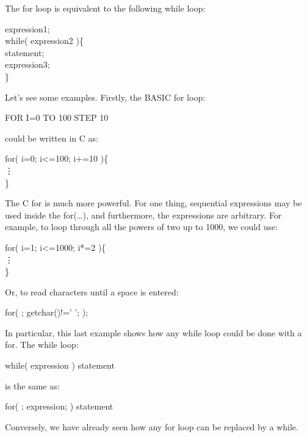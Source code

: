 The {\cd for} loop is equivalent to the following {\cd while} loop:
\begin{code}
{\ms expression1\/}; \\
while( {\ms expression2\/} )\{ \\
\>  {\ms statement\/}; \\
\>  {\ms expression3\/}; \\
\} 
\end{code}
\noindent
     Let's see some examples. Firstly, the BASIC for loop:
\begin{code}
FOR I=0 TO 100 STEP 10
\end{code}
\noindent
     could be written in C as:
\begin{code}
for( i=0; i<=100; i+=10 )\{ \\
\> \vdots \\
\}
\end{code}
\noindent
     The C  {\cd for} is  much more  powerful. For one thing,
sequential expressions may be  used inside the {\cd for(\ldots)}, and 
furthermore, the expressions are arbitrary. For example, to loop
through all the powers of two up to 1000, we could use:
 \begin{code}
for( i=1; i<=1000; i*=2 )\{ \\
\> \vdots \\
\}
\end{code}
\noindent
     Or, to read characters until a space is entered:
\begin{code}
for( ; getchar()!=' '; );
\end{code}
\noindent
     In particular,  this last  example shows how any {\cd while}
loop could be done with a {\cd for}. The {\cd while} 
loop:
\begin{code}
while( {\ms expression\/} ) {\ms statement\/}
\end{code}
\noindent
     is the same as:
\begin{code}
for( ; {\ms expression\/}; ) {\ms statement\/}
\end{code}
\noindent
     Conversely, we have already seen how any {\cd for} loop can be
replaced by a {\cd while}. 

